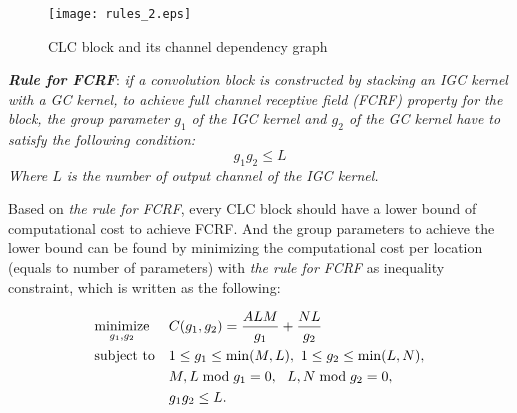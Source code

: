\documentclass[10pt,twocolumn,letterpaper]{article}
\begin{document}
\begin{figure}[t!]
\begin{center}
\texttt{[image: rules\_2.eps]}
\end{center}
   \caption{CLC block and its channel dependency graph}
\label{fig:FCRF}
\end{figure}

\vspace{10pt}
\textbf{\textit{Rule for FCRF}}: \textit{if a convolution block is constructed by stacking an IGC kernel with a GC kernel, to achieve full channel receptive field (FCRF) property for the block, the group parameter $g_1$ of the IGC kernel and $g_2$ of the GC kernel have to satisfy the following condition:} 
\begin{equation}
g_1g_2 \le{L}
\label{eq:FCRF}
\end{equation}
\textit{Where $L$ is the number of output channel of the IGC kernel.}
\vspace{4pt}

Based on \textit{the rule for FCRF}, every CLC block should have a lower bound of computational cost to achieve FCRF.  And the group parameters to achieve the lower bound can be found by minimizing the computational cost per location (equals to number of parameters) with \textit{the rule for FCRF} as inequality constraint, which is written as the following:

\begin{align}
& \underset{g_1,g_2}{\text{minimize}} & & C(g_1,g_2) = \frac{ALM}{g_1} + \frac{NL}{g_2} \label{eq:min_cost} \\
\notag& \text{subject to} & & 1\le{g_1}\le{\min(M,L)},\  1\le{g_2}\le{\min(L,N)}, \\
\notag&&& M,L \bmod g_1=0,\ \ L,N\bmod g_2=0, \\
\notag&&& g_1g_2\le{L}.
\end{align}
\end{document}
